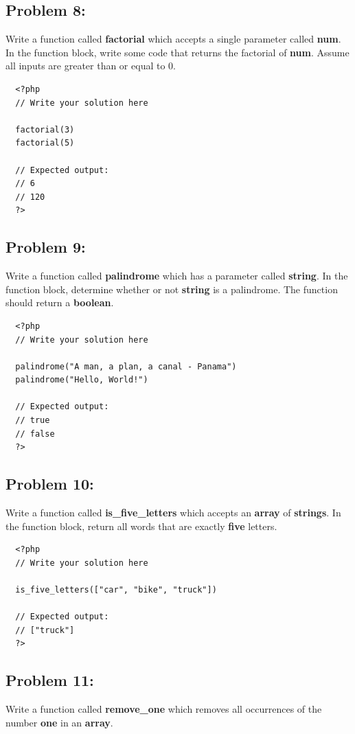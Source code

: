 \documentclass{article}
\begin{document}
\subsection*{Problem 8:}
Write a function called \textbf{factorial} which accepts a single parameter called \textbf{num}. In the function block, write some code that returns the factorial of \textbf{num}. Assume all inputs are greater than or equal to 0. 

\begin{verbatim}
  <?php  
  // Write your solution here

  factorial(3)
  factorial(5)

  // Expected output:
  // 6
  // 120
  ?>
\end{verbatim}

\subsection*{Problem 9:}
Write a function called \textbf{palindrome} which has a parameter called \textbf{string}. In the function block, determine whether or not \textbf{string} is a palindrome. The function should return a \textbf{boolean}.

\begin{verbatim}
  <?php  
  // Write your solution here

  palindrome("A man, a plan, a canal - Panama")
  palindrome("Hello, World!")

  // Expected output:
  // true
  // false
  ?>
\end{verbatim}
 
\subsection*{Problem 10:}
Write a function called \textbf{is\_five\_letters} which accepts an \textbf{array} of \textbf{strings}. In the function block, return all words that are exactly \textbf{five} letters.

\begin{verbatim}
  <?php  
  // Write your solution here

  is_five_letters(["car", "bike", "truck"])

  // Expected output:
  // ["truck"]
  ?>
\end{verbatim}

\subsection*{Problem 11:}
Write a function called \textbf{remove\_one} which removes all occurrences of the number \textbf{one} in an \textbf{array}. 
\end{document}

